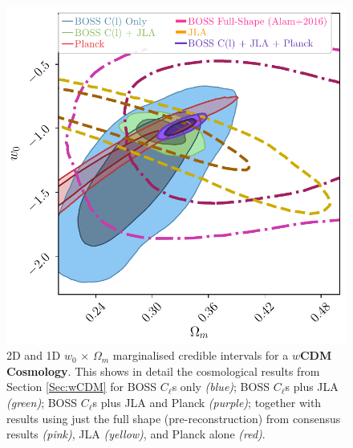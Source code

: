 \begin{figure}
\begin{center}
\includegraphics[scale=0.70]{BOSS-FIGS/w0_Om_wCDM.pdf}
\caption[2D and 1D $w_0 \, \times \, \Omega_m$ marginalised credible intervals for a $w$CDM Cosmology.]{2D and 1D $w_0 \, \times \, \Omega_m$ marginalised credible intervals for a \textbf{$w$CDM Cosmology}. This shows in detail the cosmological results from Section \ref{Sec:wCDM} for BOSS $C_{\ell}$s only \textit{(blue)}; BOSS $C_{\ell}$s plus JLA \textit{(green)}; BOSS $C_{\ell}$s plus JLA and Planck \textit{(purple)}; together with results using just the full shape (pre-reconstruction) from \protect\cite{2016BOSSCosmology} consensus results \textit{(pink)}, JLA \textit{(yellow)}, and Planck alone \textit{(red)}.}
\label{fig:Om_w0_wCDM}
\end{center}
\end{figure}

